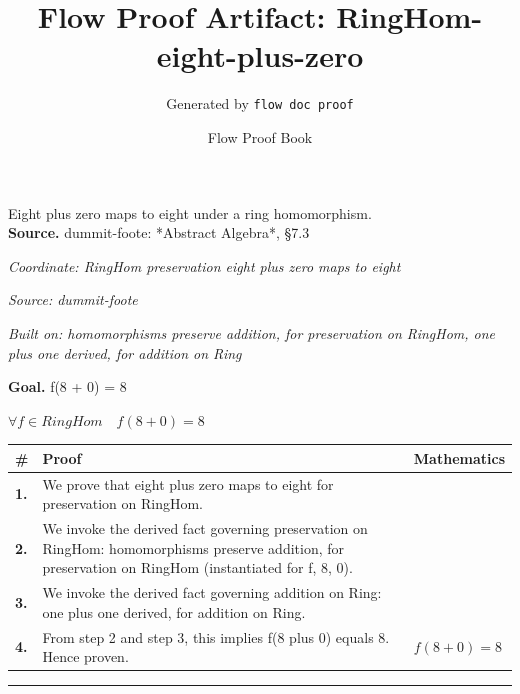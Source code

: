 \documentclass[11pt]{article}
\title{Flow Proof Artifact: RingHom-eight-plus-zero}
\author{Generated by \texttt{flow doc proof}}
\date{Flow Proof Book}
\theoremstyle{definition}
\begin{document}
\maketitle
Eight plus zero maps to eight under a ring homomorphism.\\[0.5em]
\textbf{Source.} dummit-foote: *Abstract Algebra*, §7.3\\[0.5em]
\bigskip
{}\par
\smallskip\noindent\textit{Coordinate: RingHom \cdot preservation \cdot eight plus zero maps to eight}\par
\smallskip\noindent\textit{Source: dummit-foote}\par
\smallskip\noindent\textit{Built on: homomorphisms preserve addition, for preservation on RingHom, one plus one derived, for addition on Ring}\par
\medskip
\noindent\textbf{Goal.} f(8 + 0) = 8\par
\noindent$\displaystyle \forall f \in RingHom\quad f(8 + 0) = 8$\par
\medskip
\noindent
\begin{tabular}{@{} >{\raggedright\arraybackslash}p{} >{\raggedright\arraybackslash}p{} >{\raggedleft\arraybackslash}p{} @{}}
\textbf{\#} & \textbf{Proof} & \textbf{Mathematics} \\
\midrule
\textbf{1.} & We prove that eight plus zero maps to eight for preservation on RingHom. & \\[0.45em]
\textbf{2.} & We invoke the derived fact governing preservation on RingHom: homomorphisms preserve addition, for preservation on RingHom (instantiated for f, 8, 0). & \\[0.45em]
\textbf{3.} & We invoke the derived fact governing addition on Ring: one plus one derived, for addition on Ring. & \\[0.45em]
\textbf{4.} & From step 2 and step 3, this implies f(8 plus 0) equals 8. Hence proven. & $\displaystyle f(8 + 0) = 8$ \\[0.45em]
\bottomrule
\end{tabular}
\label{thm:RingHom-preservation-eight_plus_zero_maps_to_eight}
\par\medskip\hrule
\end{document}
